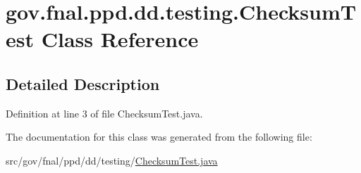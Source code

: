 \hypertarget{classgov_1_1fnal_1_1ppd_1_1dd_1_1testing_1_1ChecksumTest}{\section{gov.\-fnal.\-ppd.\-dd.\-testing.\-Checksum\-Test Class Reference}
\label{classgov_1_1fnal_1_1ppd_1_1dd_1_1testing_1_1ChecksumTest}
}


\subsection{Detailed Description}


Definition at line 3 of file Checksum\-Test.\-java.



The documentation for this class was generated from the following file\-:\begin{DoxyCompactItemize}
\item 
src/gov/fnal/ppd/dd/testing/\hyperlink{ChecksumTest_8java}{Checksum\-Test.\-java}\end{DoxyCompactItemize}

